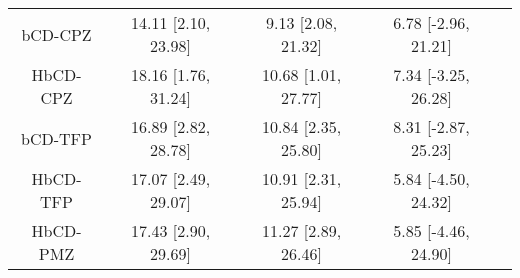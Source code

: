 \documentclass[8pt]{article}
\begin{document}
\begin{center}
\begin{footnotesize}
\begin{longtable}{|ccccc|}
 bCD-CPZ & 14.11 [2.10, 23.98] &  9.13 [2.08, 21.32] & 6.78 [-2.96, 21.21] \\
HbCD-CPZ & 18.16 [1.76, 31.24] & 10.68 [1.01, 27.77] & 7.34 [-3.25, 26.28] \\
 bCD-TFP & 16.89 [2.82, 28.78] & 10.84 [2.35, 25.80] & 8.31 [-2.87, 25.23] \\
HbCD-TFP & 17.07 [2.49, 29.07] & 10.91 [2.31, 25.94] & 5.84 [-4.50, 24.32] \\
HbCD-PMZ & 17.43 [2.90, 29.69] & 11.27 [2.89, 26.46] & 5.85 [-4.46, 24.90] \\
\end{longtable}
\end{footnotesize}
\end{center}
\end{document}

